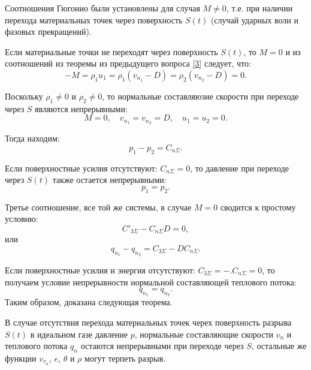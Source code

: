 
Соотношения Гюгонио были установлены для случая $M \not = 0$, т.е. при наличии перехода материальных точек через поверхность $S(t)$ (случай ударных волн и фазовых превращений). 

Если материальные точки не переходят через поверхность $S(t)$, то $M = 0$ и из соотношений из теоремы из предыдущего вопроса \ref{3} следует, что:
\begin{equation*}
	-M = \rho_1 u_1 = \rho_1 \left(v_{n_1} - D\right) = \rho_2 \left(v_{n_2} - D\right) = 0.
\end{equation*}

Поскольку $\rho_1 \not = 0$ и $\rho_2 \not = 0$, то нормальные составляюзие скорости при переходе через $S$ являются непрерывными:
\begin{equation*}
	M = 0, \quad v_{n_1} = v_{n_2} = D, \quad u_1 = u_2 = 0.
\end{equation*}

Тогда находим:
\begin{equation*}
	p_1 - p_2 = C_{n\Sigma}.
\end{equation*}

Если поверхностные усилия отсутствуют: $C_{n\Sigma} = 0$, то давление при переходе через $S(t)$ также остается непрерывными:
\begin{equation*}
	p_1 = p_2.
\end{equation*}

Третье соотношение, все той же системы, в случае $M = 0$ сводится к простому условию:
\begin{equation*}
	C'_{3\Sigma} - C_{n\Sigma} D = 0,
\end{equation*}
или
\begin{equation*}
	q_{n_1} - q_{n_2} = C_{3\Sigma} - D C_{n\Sigma}.
\end{equation*}

Если поверхностные усилия и энергия отсутствуют: $C_{3\Sigma} = -. C_{n\Sigma} = 0$, то получаем условие непрерывности нормальной составляющей теплового потока:
\begin{equation*}
	q_{n_1} = q_{n_2}.
\end{equation*}
Таким образом, доказана следующая теорема.

\begin{theorem}
	В случае отсутствия перехода материальных точек черех поверхность разрыва $S(t)$ в идеальном газе давление $p$, нормальные составляющие скорости $v_n$ и теплового потока $q_n$ остаются непрерывными при переходе через $S$, остальные же функции $v_{\tau_\alpha}$, $e$, $\theta$ и $\rho$ могут терпеть разрыв. 
\end{theorem}